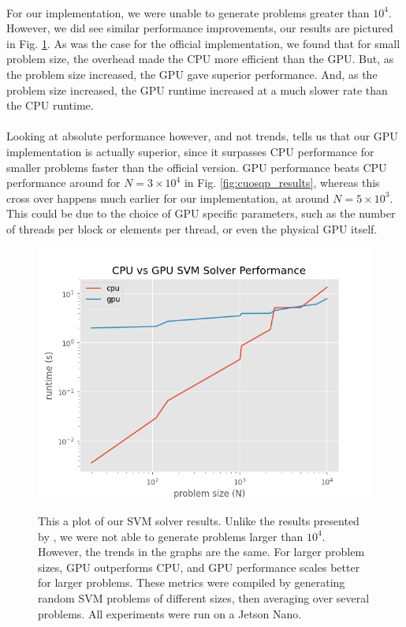 \documentclass[justified,nobib]{tufte-handout}
\begin{document}
\begin{fullwidth}
\paragraph{} For our implementation, we were unable to generate problems greater than $10^4$. However, we did see similar performance improvements, our results are pictured in Fig. \ref{fig:results}. As was the case for the official implementation, we found that for small problem size, the overhead made the CPU more efficient than the GPU. But, as the problem size increased, the GPU gave superior performance. And, as the problem size increased, the GPU runtime increased at a much slower rate than the CPU runtime. 
\paragraph{} Looking at absolute performance however, and not trends, tells us that our GPU implementation is actually superior, since it surpasses CPU performance for smaller problems faster than the official version. GPU performance beats CPU performance around for $N=3\times1 0^4$ in Fig. \ref{fig:cuosqp_results}, whereas this cross over happens much earlier for our implementation, at around $N=5\times 10^3$. This could be due to the choice of GPU specific parameters, such as the number of threads per block or elements per thread, or even the physical GPU itself. 
\begin{figure}[h]
\includegraphics[scale=.6]{./media/results.png}
\label{fig:results}
\caption{This a plot of our SVM solver results. Unlike the results presented by \cite{cuosqp}, we were not able to generate problems larger than $10^4$. However, the trends in the graphs are the same. For larger problem sizes, GPU outperforms CPU, and GPU performance scales better for larger problems. These metrics were compiled by generating random SVM problems of different sizes, then averaging over several problems. All experiments were run on a Jetson Nano.}
\end{figure}\\


\end{fullwidth}
\end{document}
